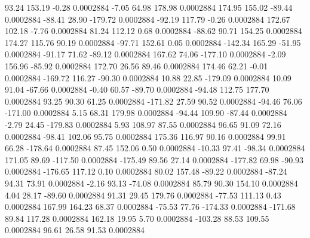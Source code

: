        93.24      153.19       -0.28     0.0002884
       -7.05       64.98      178.98     0.0002884
      174.95      155.02      -89.44     0.0002884
      -88.41       28.90     -179.72     0.0002884
      -92.19      117.79       -0.26     0.0002884
      172.67      102.18       -7.76     0.0002884
       81.24      112.12        0.68     0.0002884
      -88.62       90.71      154.25     0.0002884
      174.27      115.76       90.19     0.0002884
      -97.71      152.61        0.05     0.0002884
     -142.34      165.29      -51.95     0.0002884
      -91.17       71.62      -89.12     0.0002884
      167.62       74.06     -177.10     0.0002884
       -2.09      156.96      -85.92     0.0002884
      172.70       26.56       89.46     0.0002884
      174.46       62.21       -0.01     0.0002884
     -169.72      116.27      -90.30     0.0002884
       10.88       22.85     -179.09     0.0002884
       10.09       91.04      -67.66     0.0002884
       -0.40       60.57      -89.70     0.0002884
      -94.48      112.75      177.70     0.0002884
       93.25       90.30       61.25     0.0002884
     -171.82       27.59       90.52     0.0002884
      -94.46       76.06     -171.00     0.0002884
        5.15       68.31      179.98     0.0002884
      -94.44      109.90      -87.44     0.0002884
       -2.79       24.45     -179.83     0.0002884
        5.93      108.97       87.55     0.0002884
       96.65       91.09       72.16     0.0002884
      -98.41      102.06       95.75     0.0002884
      175.36      116.97       90.16     0.0002884
       99.91       66.28     -178.64     0.0002884
       87.45      152.06        0.50     0.0002884
      -10.33       97.41      -98.34     0.0002884
      171.05       89.69     -117.50     0.0002884
     -175.49       89.56       27.14     0.0002884
     -177.82       69.98      -90.93     0.0002884
     -176.65      117.12        0.10     0.0002884
       80.02      157.48      -89.22     0.0002884
      -87.24       94.31       73.91     0.0002884
       -2.16       93.13      -74.08     0.0002884
       85.79       90.30      154.10     0.0002884
        4.04       28.17      -89.60     0.0002884
       91.31       29.45      179.76     0.0002884
      -77.53      111.13        0.43     0.0002884
      167.99      164.23       68.37     0.0002884
      -75.53       77.76     -174.33     0.0002884
     -171.68       89.84      117.28     0.0002884
      162.18       19.95        5.70     0.0002884
     -103.28       88.53      109.55     0.0002884
       96.61       26.58       91.53     0.0002884
